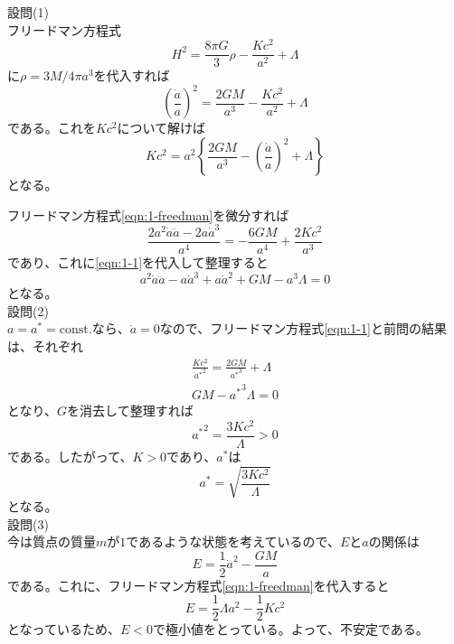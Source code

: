 \documentclass[unicode,a4paper,10pt]{ltjsarticle}
\begin{document}
\maketitle

設問(1)\\

フリードマン方程式
\begin{equation}
  H^2
  =
  \frac{8\pi G}{3}\rho
  -
  \frac{Kc^2}{a^2}
  +
  \Lambda
\end{equation}
に$\rho=3M/4\pi a^3$を代入すれば
\begin{equation}
  \left(  
    \frac{\dot{a}}{a}
  \right)^2
  =
  \frac{2GM}{a^3}
  -
  \frac{Kc^2}{a^2}
  +
  \Lambda  
  \label{eqn:1-freedman}
\end{equation}
である。これを$Kc^2$について解けば
\begin{equation}
  Kc^2
  =
  a^2
  \left\{
    \frac{2GM}{a^3}
    -
    \left( \frac{\dot{a}}{a} \right)^2
    +
    \Lambda
  \right\}
  \label{eqn:1-1}
\end{equation}
となる。

フリードマン方程式\eqref{eqn:1-freedman}を微分すれば
\begin{equation}
  \frac{2a^2\dot{a}\ddot{a}-2a\dot{a}^3}{a^4}
  =
  -\frac{6GM}{a^4}+\frac{2Kc^2}{a^3}
\end{equation}
であり、これに\eqref{eqn:1-1}を代入して整理すると
\begin{equation}
  a^2\dot{a}\ddot{a}
  -
  a\dot{a}^3
  +
  a\dot{a}^2
  +
  GM
  -
  a^3\Lambda
  =
  0
\end{equation}
となる。\\


設問(2)\\

$a=a^{\ast}=\text{const.}$なら、$\dot{a}=0$なので、フリードマン方程式\eqref{eqn:1-1}と前問の結果は、それぞれ
\begin{gather}
  \frac{Kc^2}{{a^{\ast}}^2}
  =
  \frac{2GM}{{a^{\ast}}^3}
  +
  \Lambda
  \\
  GM
  -
  {a^{\ast}}^3\Lambda
  =
  0
\end{gather}
となり、$G$を消去して整理すれば
\begin{equation}
  {a^{\ast}}^2
  =
  \frac{3Kc^2}{\Lambda}
  >
  0
\end{equation}
である。したがって、$K>0$であり、$a^{\ast}$は
\begin{equation}
  {a^{\ast}}
  =
  \sqrt{\frac{3Kc^2}{\Lambda}}
\end{equation}
となる。\\


設問(3)\\

今は質点の質量$m$が$1$であるような状態を考えているので、$E$と$a$の関係は
\begin{equation}
  E
  =
  \frac{1}{2}\dot{a}^2
  -
  \frac{GM}{a}
\end{equation}
である。これに、フリードマン方程式\eqref{eqn:1-freedman}を代入すると
\begin{equation}
  E
  =
  \frac{1}{2}\Lambda a^2
  -
  \frac{1}{2}Kc^2
\end{equation}
となっているため、$E<0$で極小値をとっている。よって、不安定である。
\end{document}
